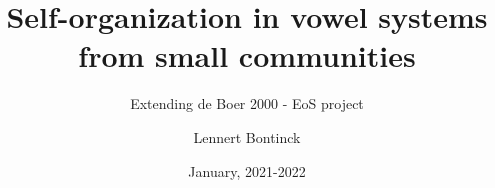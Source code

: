 \title{Self-organization in vowel systems from small communities}
\subtitle{Extending de Boer 2000 - EoS project}
\author{Lennert Bontinck}
\date{January, 2021-2022}

